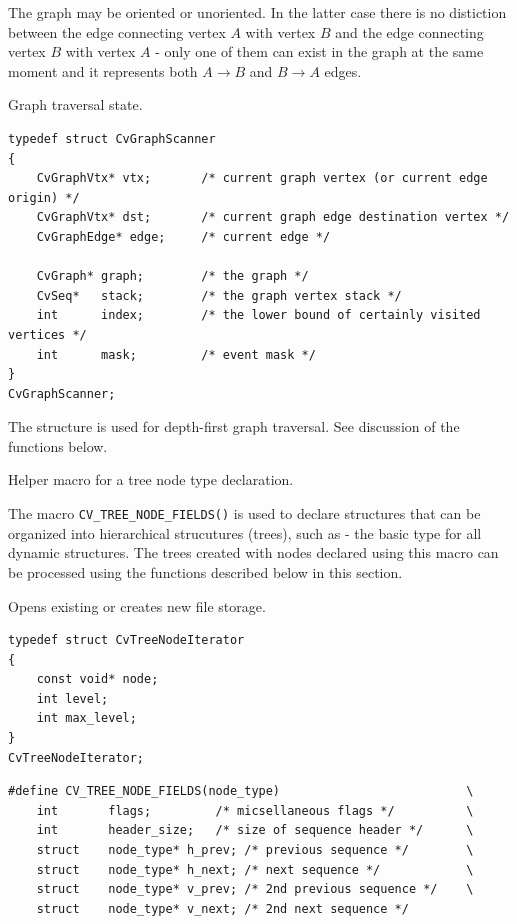 The graph may be oriented or unoriented. In the latter case there is no
distiction between the edge connecting vertex $A$ with vertex $B$ and the edge
connecting vertex $B$ with vertex $A$ - only one of them can exist in the
graph at the same moment and it represents both $A \rightarrow B$ and
$B \rightarrow A$ edges.

\label{CvGraphScanner}
Graph traversal state.

\begin{lstlisting}
typedef struct CvGraphScanner
{
    CvGraphVtx* vtx;       /* current graph vertex (or current edge origin) */
    CvGraphVtx* dst;       /* current graph edge destination vertex */
    CvGraphEdge* edge;     /* current edge */

    CvGraph* graph;        /* the graph */
    CvSeq*   stack;        /* the graph vertex stack */
    int      index;        /* the lower bound of certainly visited vertices */
    int      mask;         /* event mask */
}
CvGraphScanner;

\end{lstlisting}

The structure  is used for depth-first graph traversal. See discussion of the functions below.

\label{CV_TREE_NODE_FIELDS}
Helper macro for a tree node type declaration.

The macro \texttt{CV\_TREE\_NODE\_FIELDS()} is used to declare structures
that can be organized into hierarchical strucutures (trees), such as
 - the basic type for all dynamic structures. The trees
created with nodes declared using this macro can be processed using the
functions described below in this section.

\label{CvTreeNodeIterator}
Opens existing or creates new file storage.

\begin{lstlisting}
typedef struct CvTreeNodeIterator
{
    const void* node;
    int level;
    int max_level;
}
CvTreeNodeIterator;
\end{lstlisting}

\begin{lstlisting}
#define CV_TREE_NODE_FIELDS(node_type)                          \
    int       flags;         /* micsellaneous flags */          \
    int       header_size;   /* size of sequence header */      \
    struct    node_type* h_prev; /* previous sequence */        \
    struct    node_type* h_next; /* next sequence */            \
    struct    node_type* v_prev; /* 2nd previous sequence */    \
    struct    node_type* v_next; /* 2nd next sequence */

\end{lstlisting}

